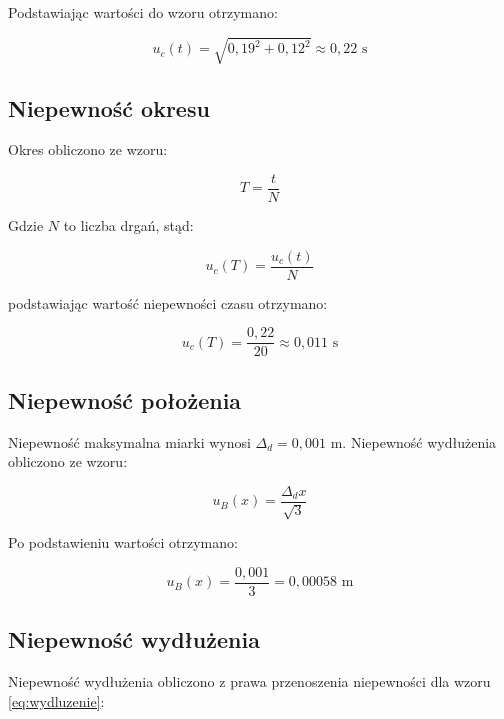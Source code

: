 \documentclass[a4paper,12pt]{article}
\begin{document}
Podstawiając wartości do wzoru otrzymano:

\begin{equation*}
    u_c(t) = \sqrt{0{,}19^2 + 0{,}12^2} \approx 0{,}22 \text{ s}
\end{equation*}





\subsection{Niepewność okresu}

Okres obliczono ze wzoru:

\begin{equation*}
    T = \frac{t}{N}
\end{equation*}

Gdzie $N$ to liczba drgań, stąd:

\begin{equation*}
    u_c(T) = \frac{u_c(t)}{N}
\end{equation*}

podstawiając wartość niepewności czasu otrzymano:

\begin{equation*}
    u_c(T) = \frac{0,22}{20} \approx 0,011 \text{ s}
\end{equation*}


\subsection{Niepewność położenia}

Niepewność maksymalna miarki wynosi $\Delta_d = 0,001$ m. Niepewność wydłużenia obliczono ze wzoru:

\begin{equation*}
    u_B(x) = \frac{\Delta_d x}{\sqrt{3}}
\end{equation*}

Po podstawieniu wartości otrzymano:

\begin{equation*}
    u_B(x) = \frac{0,001}{3} = 0,00058 \text{ m}
\end{equation*}

\subsection{Niepewność wydłużenia}

Niepewność wydłużenia obliczono z prawa przenoszenia niepewności dla wzoru \ref{eq:wydluzenie}:
\end{document}
